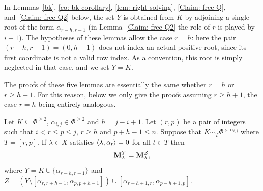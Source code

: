 \medskip
In Lemmas~\ref{bk}, \ref{co: bk corollary}, \ref{lem: right solving}, \ref{Claim: free Q}, and~\ref{Claim: free Q2}
below, the set $Y$ is obtained from $K$ by adjoining a single root of the form
$\alpha_{r-h,r-1}$ (in Lemma~\ref{Claim: free Q2} the role of $r$ is played by $i+1$). The
hypotheses of these lemmas allow the case $r=h$: here the pair $(r-h,r-1)=(0,h-1)$ does not
index an actual positive root, since its first coordinate is not a valid row index. As a
convention, this root is simply neglected in that case, and we set $Y=K$.

The proofs of these five lemmas are essentially the same whether $r=h$ or $r\ge h+1$. For this reason, below we only give the proofs assuming $r\ge h+1$, the case $r=h$
being entirely analogous.


\begin{lemma}\rm\label{bk}
    Let  $K\subseteq\Phi^{\geq 2}$, $\alpha_{i,j}\in \Phi^{\geq 2}$ and $h=j-i+1$.  Let  $(r,p)$ be a pair of integers such that $i < r \leq p \leq j $, $r\geq h$ and $ p+h-1\leq n$. Suppose that $K\sim_{T} \Phi^{\succ\alpha_{i,j}}$  where $T=[r,p]$. If  $\lambda \in X$ satisfies   $\langle \lambda , \alpha_t \rangle =0$  for all $t\in T$ then 
    \begin{equation} \label{eq: lem bk}
        \mathbf{M}_{\lambda}^{Y} = \mathbf{M}_{\lambda}^{Z},
    \end{equation}
    where $Y=K\cup \{\alpha_{r-h,r-1}\}$ and $Z=\left(Y\setminus [\alpha_{r,r+h-1},\alpha_{p,p+h-1}]\right) \cup [\alpha_{r-h+1,r},\alpha_{p-h+1,p}]$.
\end{lemma}

